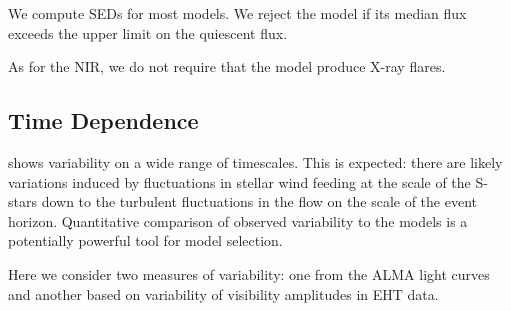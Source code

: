 We compute SEDs for most models.  We reject the model if its median flux exceeds the upper limit on the quiescent flux.

As for the NIR, we do not require that the model produce X-ray flares.  


\subsection{Time Dependence}

%


\sgra shows variability on a wide range of timescales.  This is expected: there are likely variations induced by fluctuations in stellar wind feeding at the scale of the S-stars down to the turbulent fluctuations in the flow on the scale of the event horizon.  Quantitative comparison of observed variability to the models is a potentially powerful tool for model selection.

Here we consider two measures of variability: one from the ALMA light curves and another based on variability of visibility amplitudes in EHT data.  

